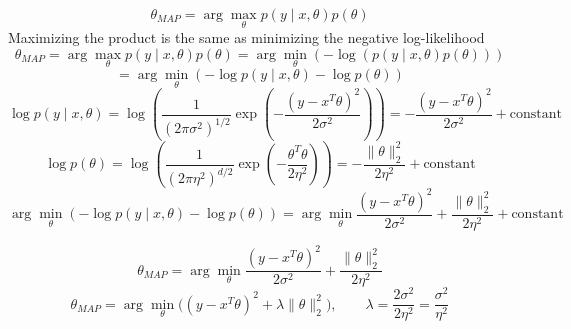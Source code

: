 \begin{answer}

$$
\theta_{MAP}​= \arg\max_{\theta} p(y \mid x, \theta) p(\theta)
$$
Maximizing the product is the same as minimizing the negative log-likelihood
$$
\theta_{MAP}​= \arg\max_{\theta} p(y \mid x, \theta) p(\theta) = \arg \min_{\theta} \left( -\log(p(y \mid x, \theta) p(\theta)) \right )
$$
$$
= \arg \min_{\theta} \left ( -\log​ p(y \mid x, \theta) - \log p(\theta) \right )
$$$$
\log p(y \mid x, \theta) = \log \left(\frac{1}{(2\pi\sigma^2)^{1/2}} \exp\left( -\frac{(y-x^T \theta)^2}{2\sigma^{2}} \right) \right) = -\frac{(y-x^T \theta)^2}{2\sigma^{2}} + \text{constant}
$$
$$
\log p(\theta) = \log \left( \frac{1}{(2\pi\eta^{2})^{d/2}} \exp\left( -\frac{\theta^{T}\theta}{2\eta^{2}} \right) \right) = -\frac{\|\theta\|^2_{2}}{2\eta^{2}} + \text{constant}
$$
$$
\arg \min_{\theta} \left ( -\log​ p(y \mid x, \theta) - \log p(\theta) \right ) = \arg \min_{\theta} \frac{(y-x^T \theta)^2}{2\sigma^{2}} + \frac{\|\theta\|^2_{2}}{2\eta^{2}} + \text{constant}
$$

$$
\theta_{MAP}​ = \arg \min_{\theta} \frac{(y-x^T \theta)^2}{2\sigma^{2}} + \frac{\|\theta\|^2_{2}}{2\eta^{2}}
$$
$$
\boxed{ \theta_{MAP} = \arg\min_{\theta} \Big( (y-x^T \theta)^{2} + \lambda\|\theta\|_2^{2} \Big), \qquad \lambda = \frac{2\sigma^{2}}{2\eta^{2}} = \frac{\sigma^{2}}{\eta^{2}} }
$$
\end{answer}
